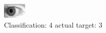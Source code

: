 \begin{figure}[h!]
\begin{center}
\includegraphics[width=0.60\columnwidth]{figures/ID242_class_4_target_3.png}
\end{center}
\caption{ Classification: 4 actual target: 3}
\label{fig:ID242_class_4_target_3}
\end{figure}
